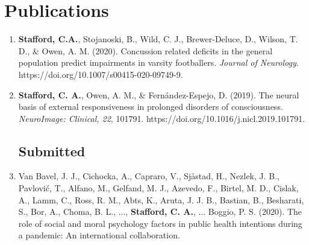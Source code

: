 \documentclass[letterpaper]{twentysecondcv} %
\begin{document}
\begin{twentyshort} %
\end{twentyshort}



\section{Publications}

\begin{enumerate} %
	\item \textbf{Stafford, C.A.}, Stojanoski, B., Wild, C. J., Brewer-Deluce, D., Wilson, T. D., \& Owen, A. M. (2020). Concussion related deficits in the general population predict impairments in varsity footballers. \emph{Journal of Neurology}.\newline
	https://doi.org/10.1007/s00415-020-09749-9.
	\item \textbf{Stafford, C. A.}, Owen, A. M., \& Fern\'andez-Espejo, D. (2019). The neural basis of external responsiveness in prolonged disorders of consciousness. \emph{NeuroImage: Clinical, 22}, 101791. https://doi.org/10.1016/j.nicl.2019.101791.
\subsection{Submitted}
	\item Van Bavel, J. J., Cichocka, A., Capraro, V., Sjåstad, H., Nezlek, J. B., Pavlović, T., Alfano, M., Gelfand, M. J., Azevedo, F., Birtel, M. D., Cislak, A., Lamm, C., Ross, R. M., Abts, K., Aruta, J. J. B., Bastian, B., Besharati, S., Bor, A., Choma, B. L., ..., \textbf{Stafford, C. A.}, ... Boggio, P. S. (2020). The role of social and moral psychology factors in public health intentions during a pandemic: An international collaboration.
\end{enumerate}
\end{document}
